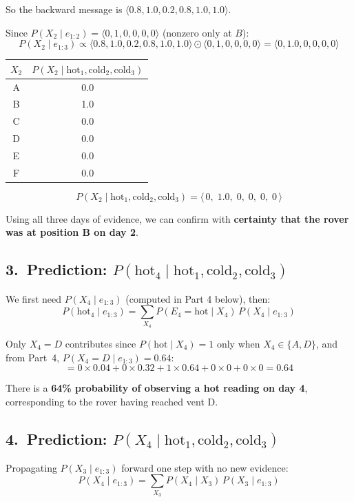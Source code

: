 \documentclass[12pt]{article}
\begin{document}
So the backward message is $\langle0.8,1.0,0.2,0.8,1.0,1.0\rangle$.

Since $P(X_2\mid e_{1:2})=\langle0,1,0,0,0,0\rangle$ (nonzero only at $B$):
\[
P(X_2\mid e_{1:3})\propto\langle0.8,1.0,0.2,0.8,1.0,1.0\rangle
\odot\langle0,1,0,0,0,0\rangle
=\langle0,1.0,0,0,0,0\rangle
\]

\begin{center}
\begin{tabular}{cc}
\toprule
$X_2$ & $P(X_2\mid\text{hot}_1,\text{cold}_2,\text{cold}_3)$\\
\midrule
A & 0.0\\ B & 1.0\\ C & 0.0\\ D & 0.0\\ E & 0.0\\ F & 0.0\\
\bottomrule
\end{tabular}
\end{center}
\[
\boxed{P(X_2\mid\text{hot}_1,\text{cold}_2,\text{cold}_3)
=\langle\,0,\;1.0,\;0,\;0,\;0,\;0\,\rangle}
\]

Using all three days of evidence, we can confirm with \textbf{certainty that the rover
was at position B on day 2}.

\subsection*{3.\ Prediction: $P(\text{hot}_4\mid\text{hot}_1,\text{cold}_2,\text{cold}_3)$}

We first need $P(X_4\mid e_{1:3})$ (computed in Part 4 below), then:
\[
P(\text{hot}_4\mid e_{1:3})
=\sum_{X_4}P(E_4{=}\text{hot}\mid X_4)\,P(X_4\mid e_{1:3})
\]

Only $X_4=D$ contributes since $P(\text{hot}\mid X_4)=1$ only when $X_4\in\{A,D\}$,
and from Part~4, $P(X_4{=}D\mid e_{1:3})=0.64$:
\[
=0\times0.04+0\times0.32+1\times0.64+0\times0+0\times0
=\boxed{0.64}
\]

There is a \textbf{64\% probability of observing a hot reading on day 4},
corresponding to the rover having reached vent D.

\subsection*{4.\ Prediction: $P(X_4\mid\text{hot}_1,\text{cold}_2,\text{cold}_3)$}

Propagating $P(X_3\mid e_{1:3})$ forward one step with no new evidence:
\[
P(X_4\mid e_{1:3})=\sum_{X_3}P(X_4\mid X_3)\,P(X_3\mid e_{1:3})
\]
\end{document}
